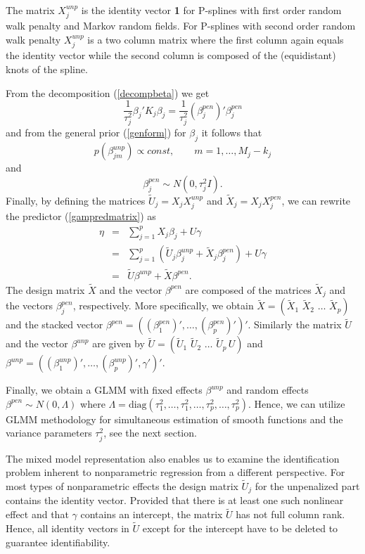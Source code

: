 \documentclass[11pt,a4paper,twoside]{bayesxarticle}
\newcommand{\diag}{\mbox{diag}}
\begin{document}
The matrix $X_j^{unp}$ is the identity vector {\bf 1} for P-splines
with first order random walk penalty and Markov random fields. For
P-splines with second order random walk penalty $X_j^{unp}$ is a two
column matrix where the first column again equals the identity
vector while the second column is composed of the (equidistant)
knots of the spline.

From the decomposition (\ref{decompbeta}) we get
$$
\frac{1}{\tau^2_j} \beta_j' K_j \beta_j = \frac{1}{\tau^2_j}
(\beta_j^{pen})' \beta_j^{pen}
$$
and from the general prior (\ref{genform}) for $\beta_j$ it follows
that
$$
p(\beta_{jm}^{unp}) \propto const , \qquad m=1,\dots, M_j-k_j
$$
and
\begin{equation}
\label{priorunp} \beta_j^{pen} \sim N(0,\tau_j^2 I).
\end{equation}
Finally, by defining the matrices $\tilde{U}_j = X_j X_j^{unp}$
and $\tilde{X}_j = X_j X_j^{pen}$, we can rewrite the predictor
(\ref{gampredmatrix}) as
\begin{eqnarray*}
\eta &=& \sum_{j=1}^{p} X_j \beta_j  + U \gamma\\
     &=& \displaystyle \sum_{j=1}^{p}  (\tilde{U}_j \beta_j^{unp} + \tilde{X}_j
     \beta_j^{pen}) +  U \gamma\\
&=& \displaystyle \tilde{U} \beta^{unp} + \tilde{X} \beta^{pen}.
\end{eqnarray*}
The design matrix $\tilde{X}$ and the vector $\beta^{pen}$ are
composed of the matrices $\tilde{X}_j$ and the vectors
$\beta_j^{pen}$, respectively. More specifically, we obtain
$\tilde{X} = (\tilde{X}_1 \,\, \tilde{X}_2 \,\, \ldots \,\,
\tilde{X}_p) $ and the stacked vector $\beta^{pen} =
((\beta_1^{pen})',\dots,(\beta_p^{pen})')'$. Similarly the matrix
$\tilde{U}$ and the vector $\beta^{unp}$ are given by $\tilde{U} =
(\tilde{U}_1 \,\, \tilde{U}_2 \,\, \ldots \,\, \tilde{U}_p \, U)$
and $\beta^{unp} =
((\beta_1^{unp})',\dots,(\beta_p^{unp})',\gamma')'$.

Finally, we obtain a GLMM with fixed effects $\beta^{unp}$ and
random effects $\beta^{pen} \sim N(0,\Lambda)$ where $\Lambda =
\diag(\tau^2_1,\dots,\tau^2_1,\dots,\tau^2_p,\dots,\tau^2_p)$.
Hence, we can utilize GLMM methodology for simultaneous estimation
of smooth functions and the variance parameters $\tau^2_j$, see the
next section.

The mixed model representation also enables us to examine the
identification problem inherent to nonparametric regression from a
different perspective. For most types of nonparametric effects the
design matrix $\tilde{U}_j$ for the unpenalized part contains the
identity vector. Provided that there is at least one such nonlinear
effect and that $\gamma$ contains an intercept, the matrix
$\tilde{U}$ has not full column rank. Hence, all identity vectors in
$\tilde{U}$ except for the intercept have to be deleted to guarantee
identifiability.
\end{document}
